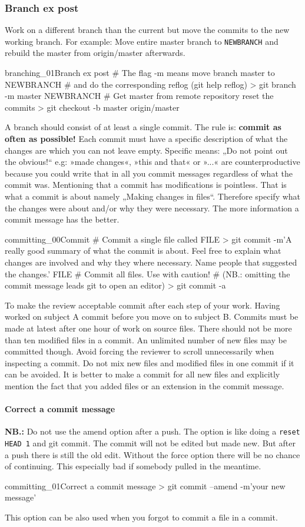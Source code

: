 \subsubsection{Branch ex post}
Work on a different branch than the current but move the commits to the new working branch. For example: Move entire master branch to \texttt{NEWBRANCH} and rebuild the master from origin/master afterwards. 
\begin{codelisting}{branching_01}{Branch ex post}
# The flag -m means move branch master to NEWBRANCH
# and do the corresponding reflog (git help reflog)
> git branch -m master NEWBRANCH
# Get master from remote repository reset the commits
> git checkout -b master origin/master
\end{codelisting}
A branch should consist of at least a single commit. The rule is: \textbf{commit as often as possible!} Each commit must have a specific description of what the changes are which you can not leave empty. Specific means: „Do not point out the obvious!“ e.g: »made changes«, »this and that« or »...« are counterproductive because you could write that in all you commit messages regardless of what the commit was. Mentioning that a commit has modifications is pointless. That is what a commit is about namely „Making changes in files“. Therefore specify what the changes were about and/or why they were necessary.  The more information a commit message has the better.
\begin{codelisting}{committing_00}{Commit}
# Commit a single file called FILE
> git commit -m'A really good summary of what the commit is about. Feel free to explain what changes are involved and why they where necessary. Name people that suggested the changes.' FILE
# Commit all files. Use with caution!
# (NB.: omitting the commit message leads git to open an editor)
> git commit -a
\end{codelisting}
To make the review acceptable commit after each step of your work. Having worked on subject A commit before you move on to subject B. Commits must be made at latest after one hour of work on source files. There should not be more than ten modified files in a commit. An unlimited number of new files may be committed though. Avoid forcing the reviewer to scroll unnecessarily when inspecting a commit. Do not mix new files and modified files in one commit if it can be avoided. It is better to make a commit for all new files and explicitly mention the fact that you added files or an extension in the commit message.
\paragraph{Correct a commit message}
\textbf{NB.:} Do not use the amend option after a push. The option is like doing a \texttt{reset HEAD~1} and git commit. The commit will not be edited but made new. But after a push there is still the old edit. Without the force option there will be no chance of continuing. This especially bad if somebody pulled in the meantime.
\begin{codelisting}{committing_01}{Correct a commit message}
> git commit --amend -m'your new message'
\end{codelisting}
This option can be also used when you forgot to commit a file in a commit.
